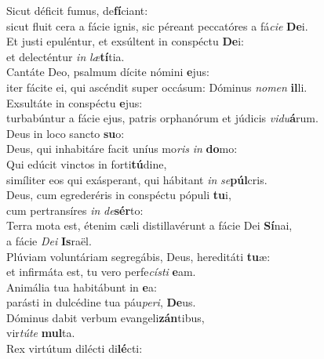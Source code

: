\evenverse Sicut déficit fumus, de\textbf{fí}ciant:~\*\\
\evenverse sicut fluit cera a fácie ignis, sic péreant peccatóres a fá\textit{ci}\textit{e} \textbf{De}i.\\
\oddverse Et justi epuléntur, et exsúltent in conspéctu \textbf{De}i:~\*\\
\oddverse et delecténtur \textit{in} \textit{læ}\textbf{tí}tia.\\
\evenverse Cantáte Deo, psalmum dícite nómini \textbf{e}jus:~\*\\
\evenverse iter fácite ei, qui ascéndit super occásum: Dóminus \textit{no}\textit{men} \textbf{il}li.\\
\oddverse Exsultáte in conspéctu \textbf{e}jus:~\*\\
\oddverse turbabúntur a fácie ejus, patris orphanórum et júdicis \textit{vi}\textit{du}\textbf{á}rum.\\
\evenverse Deus in loco sancto \textbf{su}o:~\*\\
\evenverse Deus, qui inhabitáre facit uníus mo\textit{ris} \textit{in} \textbf{do}mo:\\
\oddverse Qui edúcit vinctos in forti\textbf{tú}dine,~\*\\
\oddverse simíliter eos qui exásperant, qui hábitant \textit{in} \textit{se}\textbf{púl}cris.\\
\evenverse Deus, cum egrederéris in conspéctu pópuli \textbf{tu}i,~\*\\
\evenverse cum pertransíres \textit{in} \textit{de}\textbf{sér}to:\\
\oddverse Terra mota est, étenim cæli distillavérunt a fácie Dei \textbf{Sí}nai,~\*\\
\oddverse a fácie \textit{De}\textit{i} \textbf{Is}raël.\\
\evenverse Plúviam voluntáriam segregábis, Deus, hereditáti \textbf{tu}æ:~\*\\
\evenverse et infirmáta est, tu vero perfe\textit{cí}\textit{sti} \textbf{e}am.\\
\oddverse Animália tua habitábunt in \textbf{e}a:~\*\\
\oddverse parásti in dulcédine tua páu\textit{pe}\textit{ri}, \textbf{De}us.\\
\evenverse Dóminus dabit verbum evangeli\textbf{zán}tibus,~\*\\
\evenverse vir\textit{tú}\textit{te} \textbf{mul}ta.\\
\oddverse Rex virtútum dilécti di\textbf{lé}cti:~\*\\
